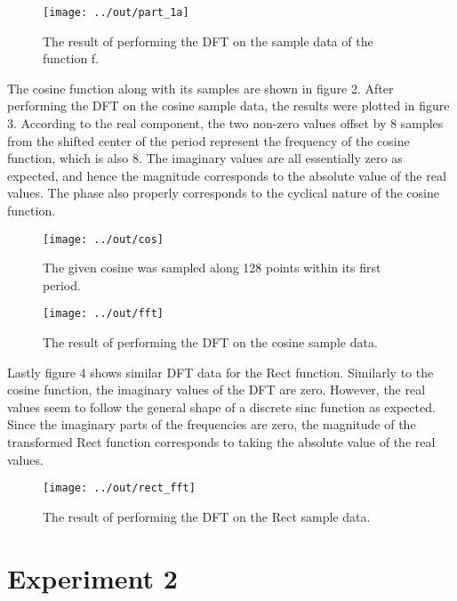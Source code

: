 \documentclass[headings=optiontoheadandtoc,listof=totoc,parskip=full]{scrartcl}
\begin{document}
\begin{figure}[H]
	\centering
	\texttt{[image: ../out/part\_1a]}
	\caption{The result of performing the DFT on the sample data of the function f.}
	\label{fig:part_1a}
\end{figure}

The cosine function along with its samples are shown in figure 2. After performing the DFT on the cosine sample data, the results were plotted in figure 3. According to the real component, the two non-zero values offset by 8 samples from the shifted center of the period represent the frequency of the cosine function, which is also 8. The imaginary values are all essentially zero as expected, and hence the magnitude corresponds to the absolute value of the real values. The phase also properly corresponds to the cyclical nature of the cosine function.

\begin{figure}[H]
	\centering
	\texttt{[image: ../out/cos]}
	\caption{The given cosine was sampled along 128 points within its first period.}
	\label{fig:cos}
\end{figure}

\begin{figure}[H]
	\centering
	\texttt{[image: ../out/fft]}
	\caption{The result of performing the DFT on the cosine sample data.}
	\label{fig:fft}
\end{figure}

Lastly figure 4 shows similar DFT data for the Rect function. Similarly to the cosine function, the imaginary values of the DFT are zero. However, the real values seem to follow the general shape of a discrete sinc function as expected. Since the imaginary parts of the frequencies are zero, the magnitude of the transformed Rect function corresponds to taking the absolute value of the real values.

\begin{figure}[H]
	\centering
	\texttt{[image: ../out/rect\_fft]}
	\caption{The result of performing the DFT on the Rect sample data.}
	\label{fig:fft}
\end{figure}


\section{Experiment 2}
\label{sec:exp-2}
\end{document}
